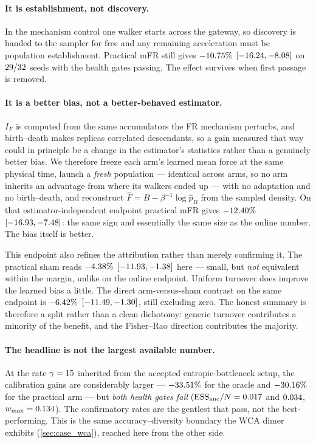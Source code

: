 \paragraph{It is establishment, not discovery.} In the mechanism control one walker starts
across the gateway, so discovery is handed to the sampler for free and any remaining
acceleration must be population establishment. Practical mFR still gives
$-10.75\%$ $[-16.24, -8.08]$ on $29/32$ seeds with the
health gates passing. The effect survives when first passage is removed.

\paragraph{It is a better bias, not a better-behaved estimator.} $I_F$ is computed from the
same accumulators the FR mechanism perturbs, and birth--death makes replicas correlated
descendants, so a gain measured that way could in principle be a change in the estimator's
statistics rather than a genuinely better bias. We therefore freeze each arm's learned mean
force at the same physical time, launch a \emph{fresh} population --- identical across arms,
so no arm inherits an advantage from where its walkers ended up --- with no adaptation and no
birth--death, and reconstruct
$\widehat F = B - \beta^{-1}\log \hat p_B$ from the sampled density. On that
estimator-independent endpoint practical mFR gives $-12.40\%$
$[-16.93, -7.48]$: the same sign and essentially the same size as the online
number. The bias itself is better.

This endpoint also refines the attribution rather than merely confirming it. The practical
sham reads $-4.38\%$ $[-11.93, -1.38]$ here --- small, but
\emph{not} equivalent within the margin, unlike on the online endpoint. Uniform turnover does
improve the learned bias a little. The direct arm-versus-sham contrast on the same endpoint
is $-6.42\%$ $[-11.49, -1.30]$, still excluding zero.
The honest summary is therefore a split rather than a clean dichotomy: generic turnover
contributes a minority of the benefit, and the Fisher--Rao direction contributes the majority.

\paragraph{The headline is not the largest available number.} At the rate
$\gamma = 15$ inherited from the accepted entropic-bottleneck setup, the
calibration gains are considerably larger --- $-33.51\%$ for the oracle and
$-30.16\%$ for the practical arm --- but \emph{both health gates fail}
($\mathrm{ESS}_{\mathrm{anc}}/N = 0.017$ and $0.034$,
$w_{\max} = 0.134$). The confirmatory rates are the gentlest that pass, not the
best-performing. This is the same accuracy--diversity boundary the WCA dimer exhibits
(\cref{sec:case_wca}), reached here from the other side.

